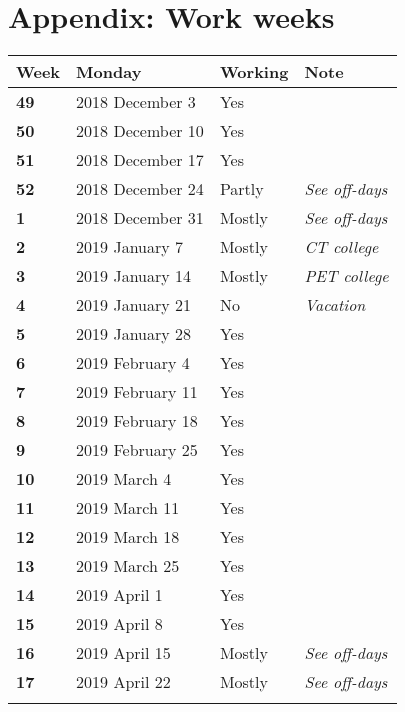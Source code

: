 \chapter{Appendix: Work weeks} \label{app:workweeks}
\begin{table} [h!]
	\begin{tabular}{l|lll}
		\textbf{Week} 	&	Monday 		&	Working	&	Note \\
		\hline
		\textbf{49} 		&	2018 December 3	&	Yes		& \\
		\rowcolor{Gray}
		\textbf{50} 	&	2018 December 10 	&	Yes		& \\
		\textbf{51} 	&	2018 December 17	&	Yes 	& \\
		\rowcolor{Gray}
		\textbf{52}		&	2018 December 24	&	Partly	& \textit{See off-days}\\
		\textbf{1}		&	2018 December 31	&	Mostly	& \textit{See off-days}\\
		\rowcolor{Gray}
		\textbf{2} 		& 	2019 January 7		& 	Mostly	&  \textit{CT college}\\
		\textbf{3} 		& 	2019 January 14		& 	Mostly	&  \textit{PET college}\\
		\rowcolor{Gray}
		\textbf{4} 		& 	2019 January 21		& 	No		&  \textit{Vacation}\\
		\textbf{5} 		& 	2019 January 28		& 	Yes		&  \\
		\rowcolor{Gray}
		\textbf{6} 		& 	2019 February 4		& 	Yes		&  \\
		\textbf{7} 		& 	2019 February 11	& 	Yes		&  \\
		\rowcolor{Gray}
		\textbf{8} 		& 	2019 February 18	& 	Yes		&  \\
		\textbf{9} 		& 	2019 February 25	& 	Yes		&  \\
		\rowcolor{Gray}
		\textbf{10} 	& 	2019 March 4		& 	Yes		&  \\
		\textbf{11} 	& 	2019 March 11		& 	Yes		&  \\
		\rowcolor{Gray}
		\textbf{12} 	& 	2019 March 18		& 	Yes		&  \\
		\textbf{13} 	& 	2019 March 25		& 	Yes		&  \\
		\rowcolor{Gray}
		\textbf{14} 	& 	2019 April 1		& 	Yes		&  \\
		\textbf{15} 	& 	2019 April 8		& 	Yes		&  \\
		\rowcolor{Gray}
		\textbf{16} 	& 	2019 April 15		& 	Mostly	&  \textit{See off-days}\\
		\textbf{17} 	& 	2019 April 22		& 	Mostly	&  \textit{See off-days}\\
		\rowcolor{Gray}

\end{tabular}
\end{table}
